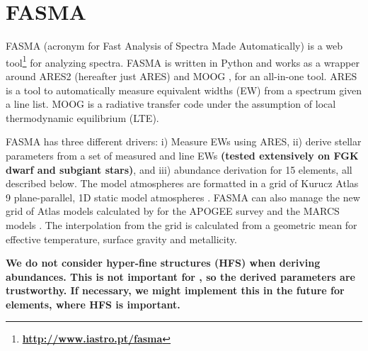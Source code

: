 \documentclass{aa}
\begin{document}
\section{FASMA}
\label{sec:FASMA}
FASMA (acronym for Fast Analysis of Spectra Made Automatically) is a web
tool\footnote{\bf \url{http://www.iastro.pt/fasma}} for analyzing
spectra. FASMA is written in Python and works as a wrapper around ARES2
\citep{Sousa2015a} (hereafter just ARES) and MOOG
\citep[][version 2014]{Sneden1973}, for an all-in-one tool. ARES is a tool to
automatically measure equivalent widths (EW) from a spectrum given a line list.
MOOG is a radiative transfer code under the assumption of local thermodynamic
equilibrium (LTE).

FASMA has three different drivers: i) Measure EWs using ARES, ii) derive stellar
parameters from a set of measured  and  line EWs {\bf
(tested extensively on FGK dwarf and subgiant stars)}, and iii) abundance
derivation for 15 elements, all described below. The model atmospheres are
formatted in a grid of Kurucz Atlas 9 plane-parallel, 1D static model
atmospheres \citet{Kurucz1993}. FASMA can also manage the new grid of Atlas
models calculated by \citet{Meszaros2012} for the APOGEE survey and the MARCS
models \citep{Gustafson2008}. The interpolation from the grid is calculated from
a geometric mean for effective temperature, surface gravity and metallicity.

{\bf We do not consider hyper-fine structures (HFS) when deriving abundances.
This is not important for , so the derived parameters are trustworthy.
If necessary, we might implement this in the future for elements, where HFS is
important.}
\end{document}
